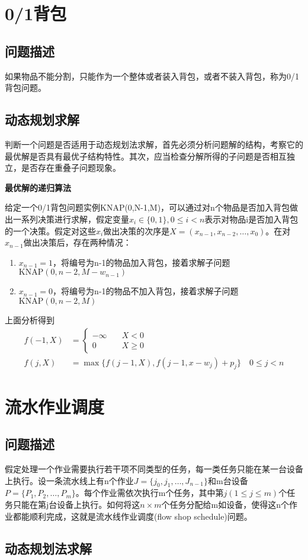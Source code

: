 \section{0/1背包}
\subsection*{问题描述}
如果物品不能分割，只能作为一个整体或者装入背包，或者不装入背包，称为0/1背包问题。
\subsection*{动态规划求解}
判断一个问题是否适用于动态规划法求解，首先必须分析问题解的结构，考察它的最优解是否具有最优子结构特性。其次，应当检查分解所得的子问题是否相互独立，是否存在重叠子问题现象。

\textbf{最优解的递归算法}

给定一个0/1背包问题实例KNAP(0,N-1,M)，可以通过对n个物品是否加入背包做出一系列决策进行求解，假定变量$x_i\in\{0,1\},0\leq i<n$表示对物品i是否加入背包的一个决策。假定对这些$x_i$做出决策的次序是$X=(x_{n-1},x_{n-2},\dots,x_0)$。在对$x_{n-1}$做出决策后，存在两种情况：
\begin{enumerate}
	\item $x_{n-1}=1$，将编号为n-1的物品加入背包，接着求解子问题$\mathrm{KNAP}(0,n-2,M-w_{n-1})$
	\item $x_{n-1}=0$，将编号为n-1的物品不加入背包，接着求解子问题$\mathrm{KNAP}(0,n-2,M)$
\end{enumerate}

上面分析得到 
\begin{equation}
	\begin{aligned}
		f(-1,X)&=\begin{cases}
			-\infty \quad &X<0\\
			0\quad &X\geq 0
		\end{cases}\\
		f(j,X)&=\max\{f(j-1,X),f(j-1,x-w_j)+p_j \}\quad 0\leq j<n
	\end{aligned}
\end{equation}
\section{流水作业调度}
\subsection*{问题描述}
假定处理一个作业需要执行若干项不同类型的任务，每一类任务只能在某一台设备上执行。设一条流水线上有n个作业$J=\{j_0,j_1,\dots,J_{n-1}\}$和m台设备$P=\{P_1,P_2,\dots,P_m \}$。每个作业需依次执行m个任务，其中第$j(1\leq j\leq m)$个任务只能在第j台设备上执行。如何将这$n\times m$个任务分配给m如设备，使得这n个作业都能顺利完成，这就是流水线作业调度(flow shop schedule)问题。
\subsection*{动态规划法求解}